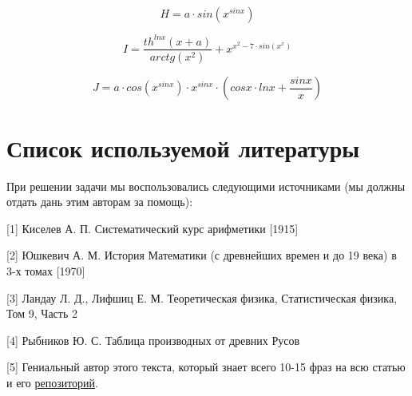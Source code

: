 \documentclass[a4paper, 12pt]{article}
\begin{document}
\begin{equation}
	H = a \cdot sin\left(x^{sinx}\right)
\end{equation}

\begin{equation}
	I = \frac{th^{lnx}\left(x + a\right)}{arctg\left(x^{2}\right)} + x^{x^{2} - 7 \cdot sin\left(x^{x}\right)}
\end{equation}

\begin{equation}
	J = a \cdot cos\left(x^{sinx}\right) \cdot x^{sinx} \cdot \left(cosx \cdot lnx + \frac{sinx}{x}\right)
\end{equation}



\section{Список используемой литературы}
При решении задачи мы воспользовались следующими источниками (мы должны отдать дань этим авторам за помощь):

[1] Киселев А. П. Систематический курс арифметики [1915]

[2] Юшкевич А. М. История Математики (с древнейших времен и до 19 века) в 3-х томах [1970]

[3] Ландау Л. Д., Лифшиц Е. М. Теоретическая физика, Статистическая физика, Том 9, Часть 2

[4] Рыбников Ю. С. Таблица производных от древних Русов

[5] Гениальный автор этого текста, который знает всего 10-15 фраз на всю статью и его \href{https://github.com/Vokerlee/Introduction-to-compiler-technologies/tree/master/8.%20Differentiator}{репозиторий}.
\end{document}
